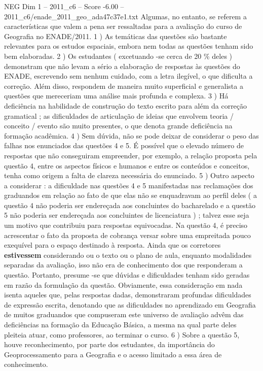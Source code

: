 \begin{textsample}{NEG Dim 1 – 2011\_c6 – Score -6.00 – 2011\_c6/enade\_2011\_geo\_ada47c37e1.txt}
Algumas, no entanto, se referem a características que valem a pena ser ressaltadas para a avaliação do curso de Geografia no ENADE/2011. 1 ) As temáticas das questões são bastante relevantes para os estudos espaciais, embora nem todas as questões tenham sido bem elaboradas. 2 ) Os estudantes ( excetuando -se cerca de 20 \% deles ) demonstram que não levam a sério a elaboração de respostas às questões do ENADE, escrevendo sem nenhum cuidado, com a letra ilegível, o que dificulta a correção.
Além disso, respondem de maneira muito superficial e generalista a questões que mereceriam uma análise mais profunda e complexa. 3 ) Há deficiência na habilidade de construção do texto escrito para além da correção gramatical ; as dificuldades de articulação de ideias que envolvem teoria / conceito / evento são muito presentes, o que denota grande deficiência na formação acadêmica. 4 ) Sem dúvida, não se pode deixar de considerar o peso das falhas nos enunciados das questões 4 e 5.
É possível que o elevado número de respostas que não conseguiram empreender, por exemplo, a relação proposta pela questão 4, entre os aspectos físicos e humanos e entre os conteúdos e conceitos, tenha como origem a falta de clareza necessária do enunciado. 5 ) Outro aspecto a considerar : a dificuldade nas questões 4 e 5 manifestadas nas reclamações dos graduandos em relação ao fato de que elas não se enquadravam ao perfil deles ( a questão 4 não poderia ser endereçada aos concluintes do bacharelado e a questão 5 não poderia ser endereçada aos concluintes de licenciatura ) ; talvez esse seja um motivo que contribuiu para respostas equivocadas.
Na questão 4, é preciso acrescentar o fato da proposta de cobrança versar sobre uma empreitada pouco exequível para o espaço destinado à resposta.
Ainda que os corretores \textbf{estivessem} considerando ou o texto ou o plano de aula, enquanto modalidades separadas da avaliação, isso não era de conhecimento dos que responderam a questão.
Portanto, presume -se que dúvidas e dificuldades tenham sido geradas em razão da formulação da questão.
Obviamente, essa consideração em nada isenta aqueles que, pelas respostas dadas, demonstraram profundas dificuldades de expressão escrita, denotando que as dificuldades no aprendizado em Geografia de muitos graduandos que compuseram este universo de avaliação advêm das deficiências na formação da Educação Básica, a mesma na qual parte deles pleiteia atuar, como professores, ao terminar o curso. 6 ) Sobre a questão 5, houve reconhecimento, por parte dos estudantes, da importância do Geoprocessamento para a Geografia e o acesso limitado a essa área de conhecimento.

\end{textsample}
